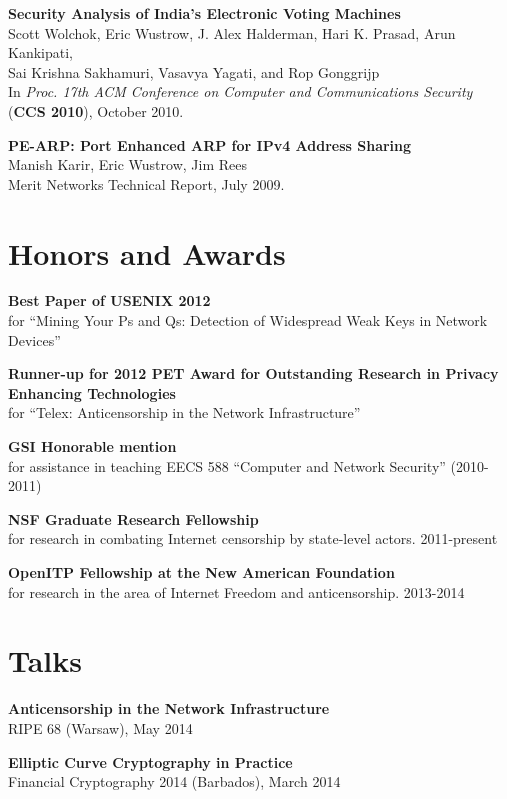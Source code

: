 \documentclass{res}
\begin{document}
\begin{resume}
	\textbf{Security Analysis of India's Electronic Voting  Machines} \\ 
	Scott Wolchok, Eric Wustrow, J. Alex Halderman, Hari K. Prasad, Arun Kankipati, \\
	Sai Krishna Sakhamuri, Vasavya Yagati, and Rop Gonggrijp \\
	In \emph{Proc. 17th ACM Conference on Computer and Communications 
	Security} \\
	(\textbf{CCS 2010}), October 2010.

	\textbf{PE-ARP: Port Enhanced ARP for IPv4 Address Sharing} \\
	Manish Karir, Eric Wustrow, Jim Rees \\
	Merit Networks Technical Report, July 2009.	

\section{Honors and Awards}

    \textbf{Best Paper of USENIX 2012} \\
    for ``Mining Your Ps and Qs: Detection of Widespread Weak Keys in Network Devices''

    \textbf{Runner-up for 2012 PET Award for Outstanding Research in Privacy Enhancing Technologies} \\
    for ``Telex: Anticensorship in the Network Infrastructure''

    \textbf{GSI Honorable mention} \\
    for assistance in teaching EECS 588 ``Computer and Network Security'' (2010-2011)

    \textbf{NSF Graduate Research Fellowship} \\
    for research in combating Internet censorship by state-level actors. 2011-present

    \textbf{OpenITP Fellowship at the New American Foundation} \\
    for research in the area of Internet Freedom and anticensorship. 2013-2014

\section{Talks}

    \textbf{Anticensorship in the Network Infrastructure} \\
    RIPE 68 (Warsaw), May 2014

    \textbf{Elliptic Curve Cryptography in Practice} \\
    Financial Cryptography 2014 (Barbados), March 2014


\end{resume}
\end{document}
